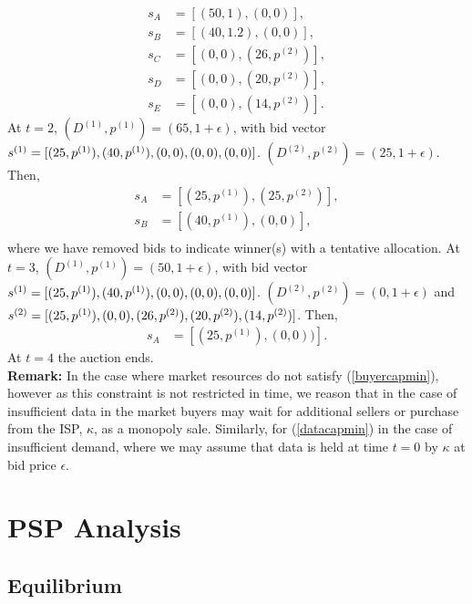 \documentclass[12pt]{article}
\theoremstyle{definition}
\begin{document}
\begin{multicols}{2}
\begin{align*}
    s_A &= [(50,1), (0,0)], \\
    s_B &= [(40,1.2), (0,0)], \\
    s_C &= [(0,0),(26,p^{(2)})], \\
    s_D &= [(0,0),(20,p^{(2)})], \\
    s_E &= [(0,0),(14,p^{(2)})].
\end{align*}
At $t=2$, $(D^{(1)},p^{(1)}) = (65,1+\epsilon)$, with
bid vector $s^{(1)}=[(25,p^{(1)}), (40,p^{(1)}), (0,0),\\ (0,0),
(0,0)]$. $(D^{(2)},p^{(2)}) = (25, 1+\epsilon)$. Then,
\begin{align*}
    s_A &= [(25,p^{(1)}), (25,p^{(2)})], \\
    s_B &= [(40,p^{(1)}), (0,0)], \\
\end{align*}
where we have removed bids to indicate winner(s) with a tentative allocation.
At $t=3$, $(D^{(1)},p^{(1)}) = (50,1+\epsilon)$, with
bid vector $s^{(1)}=[(25,p^{(1)}), (40,p^{(1)}), (0,0),\\ (0,0),
(0,0)]$. $(D^{(2)},p^{(2)}) = (0, 1+\epsilon)$ and $s^{(2)}=[(25,p^{(1)}),
(0,0), (26,p^{(2)}), (20,p^{(2)}),\\(14,p^{(2)})]$. Then,
\begin{align*}
    s_A &= [(25,p^{(1)}), (0,0))].
\end{align*}
At $t=4$ the auction ends.\\
\textbf{Remark:} In the case where market resources do not satisfy (\ref{buyercapmin}), however as
this constraint is not restricted in time, we reason that in the case of
insufficient data in the market buyers may wait for additional sellers or
purchase from the ISP, $\kappa$, as a monopoly sale. Similarly, for (\ref{datacapmin}) in
the case of insufficient demand, where we may assume that data is held at time
$t=0$ by $\kappa$ at bid price $\epsilon$.

\section{PSP Analysis}\label{analysis}


\subsection{Equilibrium}


\end{multicols}
\end{document}
